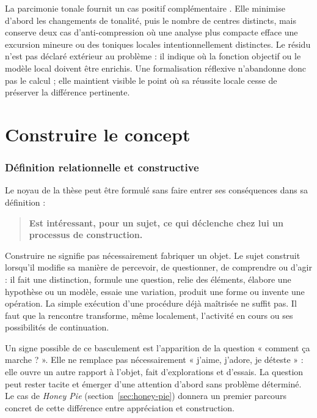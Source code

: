 \documentclass[11pt,a4paper]{article}
\begin{document}
La parcimonie tonale fournit un cas positif complémentaire
\parencite{pachet2026tonalparsimony}. Elle minimise d'abord les changements de
tonalité, puis le nombre de centres distincts, mais conserve deux cas
d'anti-compression où une analyse plus compacte efface une excursion mineure ou
des toniques locales intentionnellement distinctes. Le résidu n'est pas déclaré
extérieur au problème : il indique où la fonction objectif ou le modèle local
doivent être enrichis. Une formalisation réflexive n'abandonne donc pas le
calcul ; elle maintient visible le point où sa réussite locale cesse de préserver
la différence pertinente.

\part{Construire le concept}

\section{Définition relationnelle et constructive}

Le noyau de la thèse peut être formulé sans faire entrer ses conséquences dans
sa définition :

\begin{quote}
\textbf{Est intéressant, pour un sujet, ce qui déclenche chez lui un processus
de construction.}
\end{quote}

Construire ne signifie pas nécessairement fabriquer un objet. Le sujet construit
lorsqu'il modifie sa manière de percevoir, de questionner, de comprendre ou
d'agir : il fait une distinction, formule une question, relie des éléments,
élabore une hypothèse ou un modèle, essaie une variation, produit une forme ou
invente une opération. La simple exécution d'une procédure déjà maîtrisée ne
suffit pas. Il faut que la rencontre transforme, même localement, l'activité en
cours ou ses possibilités de continuation.

Un signe possible de ce basculement est l'apparition de la question
« comment ça marche ? ». Elle ne remplace pas nécessairement « j'aime,
j'adore, je déteste » : elle ouvre un autre rapport à l'objet, fait
d'explorations et d'essais. La question peut rester tacite et émerger d'une
attention d'abord sans problème déterminé. Le cas de \emph{Honey Pie}
(section~\ref{sec:honey-pie}) donnera un premier parcours concret de cette
différence entre appréciation et construction.
\end{document}
